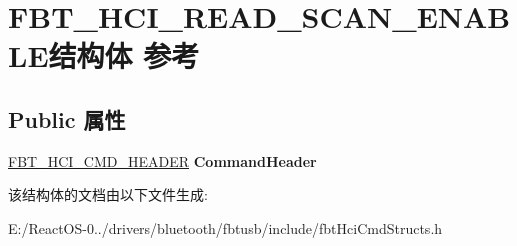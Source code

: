 \hypertarget{struct_f_b_t___h_c_i___r_e_a_d___s_c_a_n___e_n_a_b_l_e}{}\section{F\+B\+T\+\_\+\+H\+C\+I\+\_\+\+R\+E\+A\+D\+\_\+\+S\+C\+A\+N\+\_\+\+E\+N\+A\+B\+L\+E结构体 参考}
\label{struct_f_b_t___h_c_i___r_e_a_d___s_c_a_n___e_n_a_b_l_e}
\subsection*{Public 属性}
\begin{DoxyCompactItemize}
\item 
\mbox{\label{struct_f_b_t___h_c_i___r_e_a_d___s_c_a_n___e_n_a_b_l_e_a307fbe489d55234ddfdbfb5ecfb7a22c}} 
\hyperlink{struct_f_b_t___h_c_i___c_m_d___h_e_a_d_e_r}{F\+B\+T\+\_\+\+H\+C\+I\+\_\+\+C\+M\+D\+\_\+\+H\+E\+A\+D\+ER} {\bfseries Command\+Header}
\end{DoxyCompactItemize}


该结构体的文档由以下文件生成\+:\begin{DoxyCompactItemize}
\item 
E\+:/\+React\+O\+S-\/0../drivers/bluetooth/fbtusb/include/fbt\+Hci\+Cmd\+Structs.\+h\end{DoxyCompactItemize}
